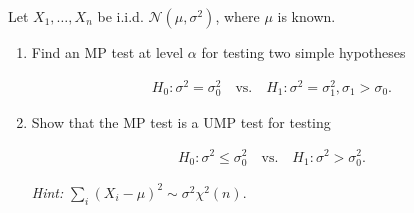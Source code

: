 
\begin{exercise}

  Let $X_1,\dots,X_n$ be i.i.d. $\mathcal{N}(\mu,\sigma^2)$, where $\mu$ is known.
  
  
  \begin{enumerate}[label = (\alph*)]
    \item Find an MP test at level $\alpha$ for testing two simple hypotheses
    
    \begin{align*}
      H_0: \sigma^2 = \sigma_0^2 \quad \text{vs.} \quad H_1: \sigma^2 = \sigma_1^2, \sigma_1 > \sigma_0.
    \end{align*}

    \item Show that the MP test is a UMP test for testing

    \begin{align*}
      H_0: \sigma^2 \leq \sigma_0^2 \quad \text{vs.} \quad H_1: \sigma^2 > \sigma_0^2.
    \end{align*}
 
    \textit{Hint:} $\sum_i (X_i - \mu)^2 \sim \sigma^2\chi^2(n)$.
  \end{enumerate}
  
  \end{exercise}
  
  
